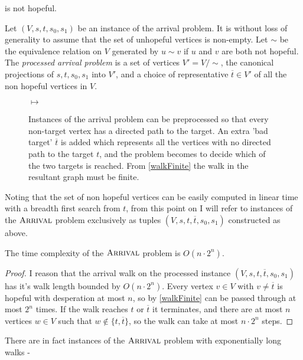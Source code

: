is not hopeful.
\begin{definition}
  Let $(V, s, t, s_0, s_1)$ be an instance of the arrival problem. It
  is without loss of generality to assume that the set of unhopeful vertices
  is non-empty. Let
  $\sim$ be the equivalence relation on $V$ generated by $u \sim v$ if
  $u$ and $v$ are both not hopeful.
  The \emph{processed arrival problem}
  is a set of vertices $V' = V / \sim$, the canonical projections of $s, t, s_0, s_1$ into $V'$,
  and a choice of representative $\overline{t} \in V'$ of all the non hopeful vertices in $V$.
\end{definition}
\begin{figure}[ht]
  \centering
  \raisebox{-0.5\height}{}
  \hfil
  $\mapsto$
  \hfil
  \raisebox{-0.5\height}{}
  \caption{Instances of the arrival problem can be preprocessed so that every non-target vertex
  has a directed path to the target. An extra 'bad target' $\overline{t}$ is added which represents
  all the vertices with no directed path to the target $t$, and the problem becomes to decide
  which of the two targets is reached. From \cref{walkFinite} 
  the walk in the resultant graph must be finite.}\label{arrivalPreprocess}
\end{figure}
Noting that the set of non hopeful vertices can be easily computed in linear time with a breadth first search
from $t$, from this point on I will refer
to instances of the $\textsc{Arrival}$ problem exclusively as tuples $(V, s, t, \overline{t}, s_0, s_1)$ 
constructed as above.
\begin{cor}
  The time complexity of the $\textsc{Arrival}$ problem is $O(n \cdot 2^n)$.
\end{cor}
\begin{proof}
  I reason that the arrival walk on the processed instance $(V, s, t, \overline{t}, s_0, s_1)$
  has it's walk length bounded by $O(n \cdot 2^n)$. Every vertex $v \in V$ with $v \neq \overline{t}$
  is hopeful with desperation at most $n$, so by \cref{walkFinite} can be passed through at most
  $2^{n}$ times. If the walk reaches $t$ or $\overline{t}$ it terminates, and there are at most
  $n$ vertices $w \in V$ such that $w \not\in \{t, \overline{t}\}$, so the walk can take at most
  $n \cdot 2^n$ steps.
\end{proof}
There are in fact instances of the $\textsc{Arrival}$ problem with exponentially long walks -
